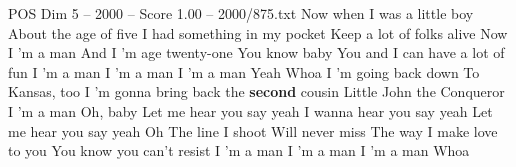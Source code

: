 \begin{textsample}{POS Dim 5 – 2000 – Score 1.00 – 2000/875.txt}  \label{ex:f5_pos_014}
Now when I was a little boy About the age of five I had something in my pocket Keep a lot of folks alive Now I 'm a man And I 'm age twenty-one You know baby You and I can have a lot of fun I 'm a man I 'm a man I 'm a man Yeah Whoa I 'm going back down To Kansas, too I 'm gonna bring back the \textbf{second} cousin Little John the Conqueror I 'm a man Oh, baby Let me hear you say yeah I wanna hear you say yeah Let me hear you say yeah Oh The line I shoot Will never miss The way I make love to you You know you can't resist I 'm a man I 'm a man I 'm a man Whoa

\end{textsample}
